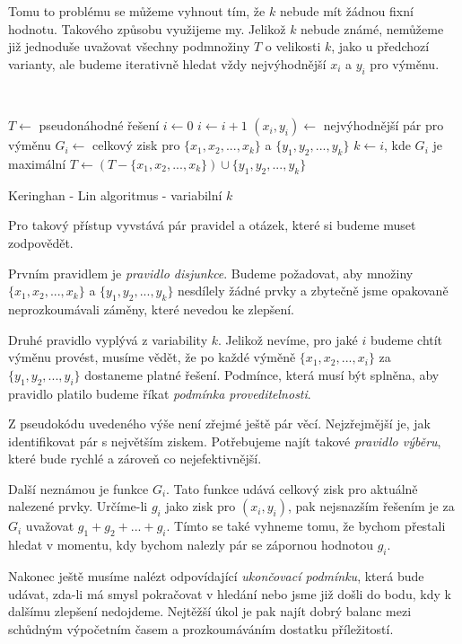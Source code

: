 \documentclass[
  biblatex,
  figures=false,
  glossaries,
  index
]{kidiplom}
\begin{document}
Tomu to problému se můžeme vyhnout tím, že $k$ nebude mít žádnou fixní hodnotu. Takového způsobu využijeme my. Jelikož $k$ nebude známé, nemůžeme již jednoduše uvažovat všechny podmnožiny $T$ o velikosti $k$, jako u předchozí varianty, ale budeme iterativně hledat vždy nejvýhodnější $x_i$ a $y_i$ pro výměnu.
\newline

{\LinesNumbered\SetAlgoNoLine\
\begin{algorithm}[H]
%
$T \leftarrow$ pseudonáhodné řešení\;
{
$i \leftarrow 0$\;
{
$i \leftarrow i + 1$\;
$(x_i, y_i) \leftarrow$ nejvýhodnější pár pro výměnu\;
$G_i \leftarrow$ celkový zisk pro $\{x_1, x_2, ..., x_k\}$ a $\{y_1, y_2, ..., y_k\}$\;
}
$k \leftarrow i$, kde $G_i$ je maximální 
$T \leftarrow (T - \{x_1, x_2, ..., x_k\}) \cup \{y_1, y_2, ..., y_k\}$\;
}
\Return \;
\caption{Keringhan - Lin algoritmus - variabilní $k$}
\end{algorithm}}\leavevmode\newline


Pro takový přístup vyvstává pár pravidel a otázek, které si budeme muset zodpovědět.

Prvním pravidlem je \textit{pravidlo disjunkce}. Budeme požadovat, aby množiny $\{x_1, x_2, ..., x_k\}$ a $\{y_1, y_2, ..., y_k\}$ nesdílely žádné prvky a zbytečně jsme opakovaně neprozkoumávali záměny, které nevedou ke zlepšení.

Druhé pravidlo vyplývá z variability $k$. Jelikož nevíme, pro jaké $i$ budeme chtít výměnu provést, musíme vědět, že po každé výměně $\{x_1, x_2, ..., x_i\}$ za $\{y_1, y_2, ..., y_i\}$ dostaneme platné řešení. Podmínce, která musí být splněna, aby pravidlo platilo budeme říkat \textit{podmínka proveditelnosti}.

Z pseudokódu uvedeného výše není zřejmé ještě pár věcí. Nejzřejmější je, jak identifikovat pár s největším ziskem. Potřebujeme najít takové \textit{pravidlo výběru}, které bude rychlé a zároveň co nejefektivnější.

Další neznámou je funkce $G_i$. Tato funkce udává celkový zisk pro aktuálně nalezené prvky. Určíme-li $g_i$ jako zisk pro $(x_i, y_i)$, pak nejsnazším řešením je za $G_i$ uvažovat $g_1 + g_2 + ... + g_i$. Tímto se také vyhneme tomu, že bychom přestali hledat v momentu, kdy bychom nalezly pár se zápornou hodnotou $g_i$.

Nakonec ještě musíme nalézt odpovídající \textit{ukončovací podmínku}, která bude udávat, zda-li má smysl pokračovat v hledání nebo jsme již došli do bodu, kdy k dalšímu zlepšení nedojdeme. Nejtěžší úkol je pak najít dobrý balanc mezi schůdným výpočetním časem a prozkoumáváním dostatku příležitostí.
\end{document}
